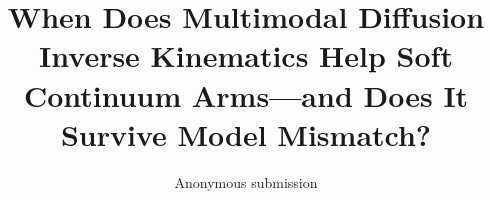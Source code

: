 \documentclass[letterpaper, 10pt, conference]{ieeeconf}
\begin{document}
\title{\LARGE \bf When Does Multimodal Diffusion Inverse Kinematics Help
Soft Continuum Arms---and Does It Survive Model Mismatch?}

\author{Anonymous submission}

\maketitle
\thispagestyle{empty}
\pagestyle{empty}





\end{document}
